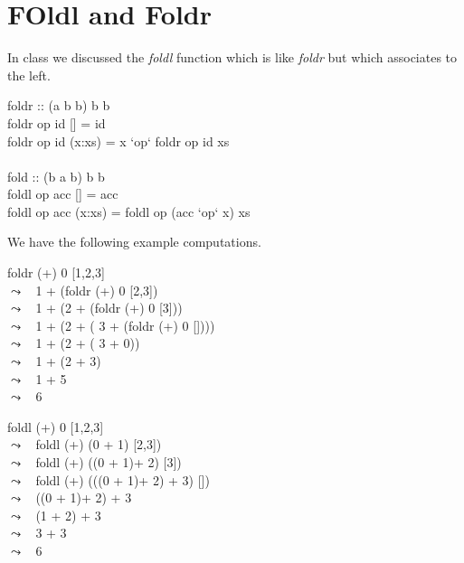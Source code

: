 \documentclass[11pt]{article}
\begin{document}

\section{FOldl and Foldr}
In class we discussed the {\em{foldl}} function which is like
{\em{foldr}} but which associates to the left.

\begin{program**}
\> foldr :: (a \arrow b \arrow b) \arrow b \arrow [a] \arrow b\\
\> foldr op id [] = id \\
\> foldr op id (x:xs) = x `op`  foldr op id xs \\
\> \\
\> fold :: (b \arrow a \arrow b) \arrow b \arrow [a] \arrow b\\
\> foldl op acc [] = acc \\
\> foldl op acc (x:xs) =  foldl op (acc `op` x) xs \\
\end{program**}

We have the following example computations.

\begin{program**}
\> foldr (+) 0  [1,2,3]\\
\> $\leadsto\;\;$ 1 + (foldr (+) 0 [2,3]) \\
\> $\leadsto\;\;$ 1 + (2 + (foldr (+) 0 [3])) \\
\> $\leadsto\;\;$ 1 + (2 + ( 3 + (foldr (+) 0 []))) \\
\> $\leadsto\;\;$ 1 + (2 + ( 3 + 0)) \\
\> $\leadsto\;\;$ 1 + (2 + 3) \\
\> $\leadsto\;\;$ 1 + 5 \\
\> $\leadsto\;\;$ 6 \\
\end{program**}


\begin{program**}
\> foldl (+) 0  [1,2,3]\\
\> $\leadsto\;\;$ foldl (+) (0 + 1) [2,3]) \\
\> $\leadsto\;\;$ foldl (+) ((0 + 1)+ 2) [3]) \\
\> $\leadsto\;\;$ foldl (+) (((0 + 1)+ 2) + 3) []) \\
\> $\leadsto\;\;$ ((0 + 1)+ 2) + 3 \\
\> $\leadsto\;\;$ (1 + 2) + 3 \\
\> $\leadsto\;\;$ 3 + 3 \\
\> $\leadsto\;\;$ 6 \\
\end{program**}
\end{document}
